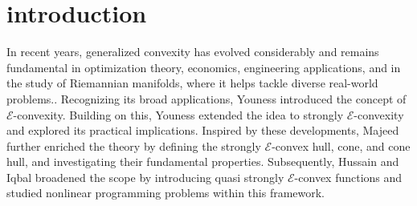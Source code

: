 \documentclass[12pt, reqno]{amsart}
\theoremstyle{definition}
\theoremstyle{remark}
\numberwithin{equation}{section}
\begin{document}
\section{\textbf{introduction}}

  In recent years, generalized convexity has evolved considerably and remains fundamental in optimization theory, economics, engineering applications, and in the study of Riemannian manifolds, where it helps tackle diverse real-world problems.\cite{hanson,Akhlad1,Akhlad2,Akhlad3,Neogy}. Recognizing its broad applications, Youness \cite{Youness1999} introduced the concept of $\mathcal{E}$-convexity. Building on this, Youness \cite{Youness2013} extended the idea to strongly $\mathcal{E}$-convexity and explored its practical implications. Inspired by these developments, Majeed \cite{S.N.2} further enriched the theory by defining the strongly $\mathcal{E}$-convex hull, cone, and cone hull, and investigating their fundamental properties. Subsequently, Hussain and Iqbal \cite{Hussain} broadened the scope by introducing quasi strongly $\mathcal{E}$-convex functions and studied nonlinear programming problems within this framework.
\end{document}
